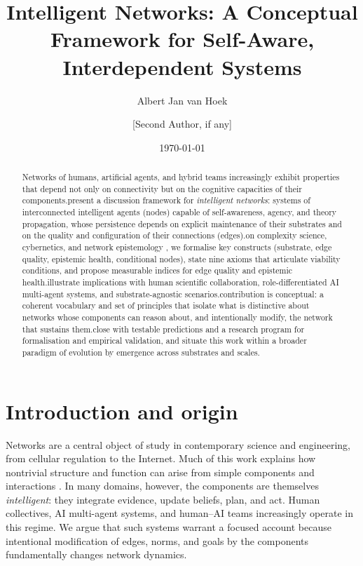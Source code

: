 \documentclass[12pt]{article}
\title{Intelligent Networks: A Conceptual Framework for Self-Aware, Interdependent Systems}
\author{Albert Jan van Hoek \and [Second Author, if any]}
\date{\today}
\begin{document}
\maketitle

\begin{abstract}
Networks of humans, artificial agents, and hybrid teams increasingly exhibit properties that depend not only on connectivity but on the cognitive capacities of their components.\nWe present a discussion framework for \emph{intelligent networks}: systems of interconnected intelligent agents (nodes) capable of self-awareness, agency, and theory propagation, whose persistence depends on explicit maintenance of their substrates and on the quality and configuration of their connections (edges).\nBuilding on complexity science, cybernetics, and network epistemology \citep{Anderson1972,Simon1962,Ashby1956,Beer1972,Zollman2010}, we formalise key constructs (substrate, edge quality, epistemic health, conditional nodes), state nine axioms that articulate viability conditions, and propose measurable indices for edge quality and epistemic health.\nWe illustrate implications with human scientific collaboration, role-differentiated AI multi-agent systems, and substrate-agnostic scenarios.\nThe contribution is conceptual: a coherent vocabulary and set of principles that isolate what is distinctive about networks whose components can reason about, and intentionally modify, the network that sustains them.\nWe close with testable predictions and a research program for formalisation and empirical validation, and situate this work within a broader paradigm of evolution by emergence across substrates and scales.
\end{abstract}


\section{Introduction and origin}
Networks are a central object of study in contemporary science and engineering, from cellular regulation to the Internet. Much of this work explains how nontrivial structure and function can arise from simple components and interactions \citep{Anderson1972,Simon1962}. In many domains, however, the components are themselves \emph{intelligent}: they integrate evidence, update beliefs, plan, and act. Human collectives, AI multi-agent systems, and human--AI teams increasingly operate in this regime. We argue that such systems warrant a focused account because intentional modification of edges, norms, and goals by the components fundamentally changes network dynamics.
\end{document}
